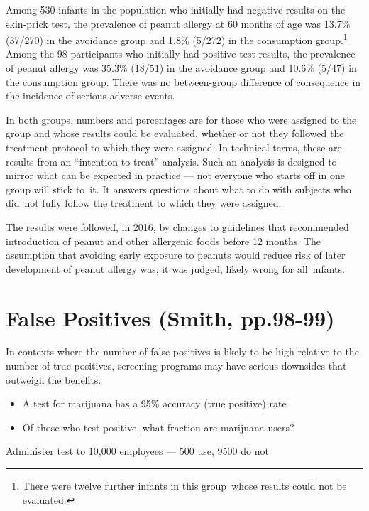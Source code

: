 \documentclass[
  10pt,
  b5paper]{book}
\providecommand{\tightlist}{%
  \setlength{\itemsep}{0pt}\setlength{\parskip}{0pt}}
\begin{document}
Among 530 infants in the population who initially had negative results on the skin-prick test, the prevalence of peanut allergy at 60 months of age was 13.7\% (37/270) in the avoidance group and 1.8\% (5/272) in the consumption group.\footnote{There were twelve further infants in this group~whose results
  could not be evaluated.}
Among the 98 participants who initially had positive test results, the prevalence of peanut allergy was 35.3\% (18/51) in the avoidance group
and 10.6\% (5/47) in the consumption group. There was no
between-group difference of consequence in the incidence of
serious adverse events.

In both groups, numbers and percentages are for those who were assigned
to the group and whose results could be evaluated, whether or not they
followed the treatment protocol to which they were assigned. In technical
terms, these are results from an ``intention to treat'' analysis. Such an
analysis is designed to mirror what can be expected in practice --- not
everyone who starts off in one group will stick to~it. It answers
questions about what to do with subjects who did~not fully follow
the treatment to which they were assigned.

The results were followed, in 2016, by changes to guidelines that
recommended introduction of peanut and other allergenic foods
before 12 months. The assumption that avoiding early exposure to
peanuts would reduce risk of later development of peanut allergy
was, it was judged, likely wrong for all~infants.

\hypertarget{false-positives-smith-pp.98-99}{%
\section{False Positives (Smith, pp.98-99)}\label{false-positives-smith-pp.98-99}}

In contexts where the number of false positives is likely to be
high relative to the number of true positives, screening
programs may have serious downsides that outweigh the benefits.

\begin{itemize}
\tightlist
\item
  A test for marijuana has a 95\% accuracy (true positive) rate
\item
  Of those who test positive, what fraction are marijuana users?
\end{itemize}

Administer test to 10,000 employees --- 500 use, 9500 do not
\end{document}
